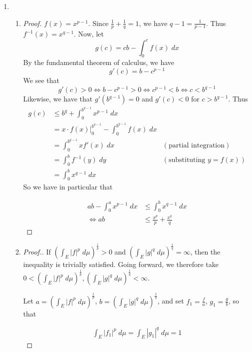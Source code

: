\documentclass[pstricks, 11pt,a4paper]{article}
\newcommand{\inorm}[2]{\left(\int_E |#1|^{#2}\;d\mu\right)^{\frac{1}{#2}}}
\theoremstyle{theorem}
\begin{document}
\begin{enumerate}
  \item
        \begin{enumerate}
          \item
                \begin{proof}
                  $f(x)=x^{p-1}$. Since $\frac{1}{p} + \frac{1}{q} = 1$, we have $q-1=\frac{1}{p-1}$. Thus $f^{-1}(x)=x^{q-1}$. Now, let
                  \[g(c)=cb-\int_{0}^{c}f(x)\;dx\]
                  By the fundamental theorem of calculus, we have
                  \[
                    g'(c)=b-c^{p-1}
                  \]
                  We see that
                  \[
                    g'(c) > 0
                    \iff b-c^{p-1}>0
                    \iff c^{p-1}<b
                    \iff c<b^{q-1}
                  \]
                  Likewise, we have that $g'(b^{q-1}) = 0$ and $g'(c)<0$ for $c>b^{q-1}$. Thus
                  \begin{align*}
                    g(c) &\leq b^{q} + \int_{0}^{b^{q-1}}x^{p-1}\;dx & \\
                         &= x\cdot f(x)\Big\rvert_{0}^{b^{q-1}}-\int_{0}^{b^{q-1}}f(x)\;dx &\\
                         &= \int_{0}^{b^{q-1}}xf'(x)\;dx &(\text{partial integration})\\
                         &= \int_{0}^{b}f^{-1}(y)\;dy &(\text{substituting } y=f(x))\\
                         &= \int_{0}^{b}x^{q-1}\;dx &
                  \end{align*}
                  So we have in particular that

                  \begin{align*}
                    ab-\int_{0}^{a}x^{p-1}\;dx &\leq \int_{0}^{b}x^{q-1}\;dx \\ \iff ab &\leq \frac{x^{p}}{p} + \frac{x^{q}}{q}
                  \end{align*}
                \end{proof}
          \item
                \begin{proof}[Proof.]
                   If $\inorm{f}{p}>0$ and $\inorm{g}{q}=\infty$, then the inequality is trivially satisfied. Going forward, we therefore take  $0<\inorm{f}{p}, \inorm{g}{q}<\infty$.

                  Let $a=\inorm{f}{p}$, $b=\inorm{g}{q}$, and set $f_{1}=\frac{f}{a}$, $g_{1}=\frac{g}{b}$, so that

                  \begin{align*}
                    \int_{E}|f_{1}|^{p}\;d\mu=\int_{E}|g_{1}|^{q}\;d\mu=1
                  \end{align*}


\end{proof}
\end{enumerate}
\end{enumerate}
\end{document}
